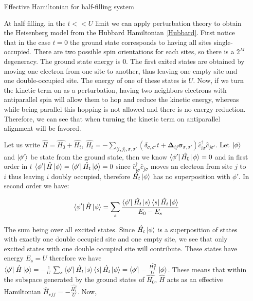 \begin{section}{Effective Hamiltonian for half-filling system}

At half filling, in the $t << U$ limit we can apply perturbation theory to obtain the Heisenberg model from the Hubbard Hamiltonian \ref{Hubbard}. First notice that in the case $t = 0$ the ground state corresponds to having all sites single-occupied. There are two possible spin orientations for each sites, so there is a $2^M$ degeneracy. The ground state energy is $0$. The first exited states are obtained by moving one electron from one site to another, thus leaving one empty site and one double-occupied site. The energy of one of these states is $U$. Now, if we turn the kinetic term on as a perturbation, having two neighbors electrons with antiparallel spin will allow them to hop and reduce the kinetic energy, whereas while being parallel this hopping is not allowed and there is no energy reduction. Therefore, we can see that when turning the kinetic term on antiparallel alignment will be favored. 

Let us write $\hat{H} = \hat{H_0} + \hat{H_t}$, $\hat{H_t} = -\sum_{\langle i,j \rangle, \sigma, \sigma'}(\delta_{\sigma, \sigma'} t + \boldsymbol{\Delta}_{ij} \boldsymbol{\sigma}_{\sigma, \sigma'})\hat{c}_{i \sigma}^\dagger \hat{c}_{j \sigma'}$. Let $\ket{\phi}$ and $\ket{\phi'}$ be state from the ground state, then we know $\bra{\phi'} \hat{H_0} \ket{\phi} = 0$ and in first order in $t$ $\bra{\phi'} \hat{H} \ket{\phi} = \bra{\phi'} \hat{H_t} \ket{\phi} = 0$ since $\hat{c}_{i \sigma}^\dagger \hat{c}_{j \sigma}$ moves an electron from site $j$ to $i$ thus leaving $i$ doubly occupied, therefore $\hat{H_t} \ket{\phi}$ has no superposition with $\phi'$. In second order we have:

\begin{equation}
\bra{\phi'} \hat{H} \ket{\phi} = \sum_s \frac{\bra{\phi'} \hat{H_t} \ket{s}\bra{s} \hat{H_t} \ket{\phi}}{E_0-E_s}
\end{equation}

The sum being over all excited states. Since $\hat{H_t}\ket{\phi}$ is a superposition of states with exactly one double occupied site and one empty site, we see that only excited states with one double occupied site will contribute. These states have energy $E_s = U$ therefore we have $\bra{\phi'} \hat{H} \ket{\phi} = -\frac{1}{U}\sum_s \bra{\phi'} \hat{H_t} \ket{s}\bra{s} \hat{H_t} \ket{\phi} = \bra{\phi'} -\frac{\hat{H_t^2}}{U} \ket{\phi}$. These means that within the subspace generated by the ground states of $\hat{H_0}$, $\hat{H}$ acts as an effective Hamiltonian $\hat{H}_{eff} = -\frac{\hat{H_t^2}}{U}$. Now,


\end{section}

